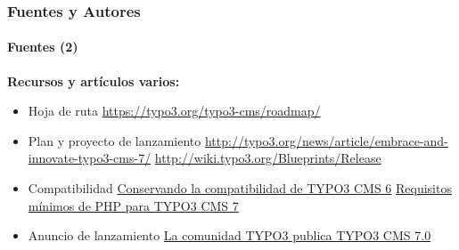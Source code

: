 \begin{frame}[fragile]
	\frametitle{Fuentes y Autores}
	\framesubtitle{Fuentes (2)}

	\textbf{Recursos y artículos varios:}
		\begin{itemize}\smaller

			\item Hoja de ruta\newline
				\url{https://typo3.org/typo3-cms/roadmap/}
			\item Plan y proyecto de lanzamiento\newline
				\url{http://typo3.org/news/article/embrace-and-innovate-typo3-cms-7/}
				\url{http://wiki.typo3.org/Blueprints/Release}
			\item Compatibilidad\newline
				\href{http://typo3.org/news/article/retaining-compatibility-to-typo3-cms6/}{Conservando la compatibilidad de TYPO3 CMS 6}\newline
				\href{http://typo3.org/news/article/php-minimum-requirements-for-typo3-cms-7/}{Requisitos mínimos de PHP para TYPO3 CMS 7}
			\item Anuncio de lanzamiento\newline
				\href{http://typo3.org/news/article/the-typo3-community-publishes-typo3-cms-70-a-new-version-of-its-free-content-management-system/}{La comunidad TYPO3 publica TYPO3 CMS 7.0}

		\end{itemize}

\end{frame}


